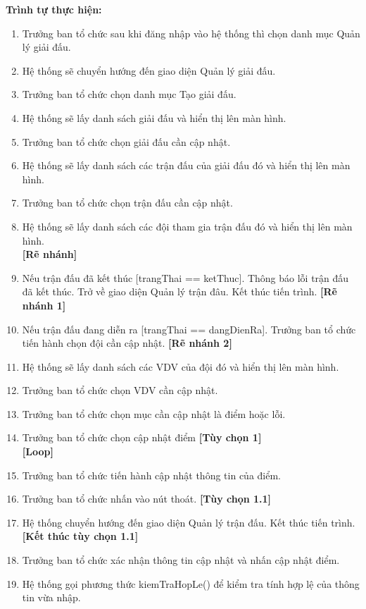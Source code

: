 \noindent
\textbf{Trình tự thực hiện:}
\begin{enumerate}
      \item Trưởng ban tổ chức sau khi đăng nhập vào hệ thống thì chọn danh mục Quản lý giải đấu.
      \item Hệ thống sẽ chuyển hướng đến giao diện Quản lý giải đấu.
      \item Trưởng ban tổ chức chọn danh mục Tạo giải đấu.
      \item Hệ thống sẽ lấy danh sách giải đấu và hiển thị lên màn hình.
      \item Trưởng ban tổ chức chọn giải đấu cần cập nhật.
      \item Hệ thống sẽ lấy danh sách các trận đấu của giải đấu đó và hiển thị lên màn hình.
      \item Trưởng ban tổ chức chọn trận đấu cần cập nhật.
      \item Hệ thống sẽ lấy danh sách các đội tham gia trận đấu đó và hiển thị lên màn hình. \\
            \textbf{[Rẽ nhánh]}
      \item Nếu trận đấu đã kết thúc [trangThai == ketThuc]. Thông báo lỗi trận đấu đã kết thúc. Trở về giao diện Quản lý trận đâu. Kết thúc tiến trình. \textbf{[Rẽ nhánh 1]}
      \item Nếu trận đấu đang diễn ra [trangThai == dangDienRa]. Trưởng ban tổ chức tiến hành chọn đội cần cập nhật. \textbf{[Rẽ nhánh 2]}
      \item Hệ thống sẽ lấy danh sách các VDV của đội đó và hiển thị lên màn hình.
      \item Trưởng ban tổ chức chọn VDV cần cập nhật.
      \item Trưởng ban tổ chức chọn mục cần cập nhật là điểm hoặc lỗi.
      \item Trưởng ban tổ chức chọn cập nhật điểm \textbf{[Tùy chọn 1]}\\
            \textbf{[Loop]}
      \item Trưởng ban tổ chức tiến hành cập nhật thông tin của điểm.
      \item Trưởng ban tổ chức nhấn vào nút thoát. \textbf{[Tùy chọn 1.1]}
      \item Hệ thống chuyển hướng đến giao diện Quản lý trận đấu. Kết thúc tiến trình.\\
            \textbf{[Kết thúc tùy chọn 1.1]}
      \item Trưởng ban tổ chức xác nhận thông tin cập nhật và nhấn cập nhật điểm.
      \item Hệ thống gọi phương thức kiemTraHopLe() để kiểm tra tính hợp lệ của thông tin vừa nhập.

\end{enumerate}
